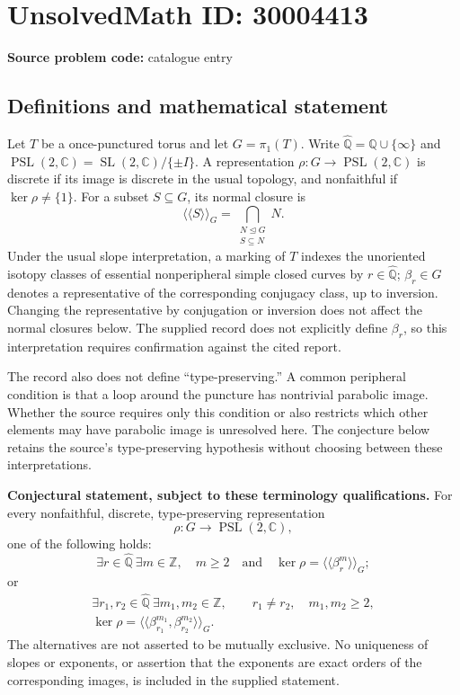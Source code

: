\documentclass[11pt]{article}
\newcommand{\Z}{\mathbb{Z}}
\newcommand{\Q}{\mathbb{Q}}
\newcommand{\C}{\mathbb{C}}
\begin{document}
\section*{UnsolvedMath ID: 30004413}
\textbf{Source problem code:} catalogue entry
\subsection{Definitions and mathematical statement}
Let \(T\) be a once-punctured torus and let \(G=\pi_1(T)\). Write \(\widehat{\Q}=\Q\cup\{\infty\}\) and \(\operatorname{PSL}(2,\C)=\operatorname{SL}(2,\C)/\{\pm I\}\). A representation \(\rho:G\to\operatorname{PSL}(2,\C)\) is discrete if its image is discrete in the usual topology, and nonfaithful if \(\ker\rho\ne\{1\}\). For a subset \(S\subseteq G\), its normal closure is
\[
\langle\!\langle S\rangle\!\rangle_G
=\bigcap_{\substack{N\trianglelefteq G\\S\subseteq N}}N.
\]
Under the usual slope interpretation, a marking of \(T\) indexes the unoriented isotopy classes of essential nonperipheral simple closed curves by \(r\in\widehat{\Q}\); \(\beta_r\in G\) denotes a representative of the corresponding conjugacy class, up to inversion. Changing the representative by conjugation or inversion does not affect the normal closures below. The supplied record does not explicitly define \(\beta_r\), so this interpretation requires confirmation against the cited report.

The record also does not define ``type-preserving.'' A common peripheral condition is that a loop around the puncture has nontrivial parabolic image. Whether the source requires only this condition or also restricts which other elements may have parabolic image is unresolved here. The conjecture below retains the source's type-preserving hypothesis without choosing between these interpretations.

\textbf{Conjectural statement, subject to these terminology qualifications.} For every nonfaithful, discrete, type-preserving representation
\[
\rho:G\longrightarrow\operatorname{PSL}(2,\C),
\]
one of the following holds:
\[
\exists r\in\widehat{\Q}\ \exists m\in\Z,\quad
m\ge2\quad\text{and}\quad
\ker\rho=\langle\!\langle\beta_r^m\rangle\!\rangle_G;
\]
or
\[
\begin{gathered}
\exists r_1,r_2\in\widehat{\Q}\ \exists m_1,m_2\in\Z,\qquad
r_1\ne r_2,\quad m_1,m_2\ge2,\\
\ker\rho=
\langle\!\langle\beta_{r_1}^{m_1},\beta_{r_2}^{m_2}\rangle\!\rangle_G.
\end{gathered}
\]
The alternatives are not asserted to be mutually exclusive. No uniqueness of slopes or exponents, or assertion that the exponents are exact orders of the corresponding images, is included in the supplied statement.
\end{document}
